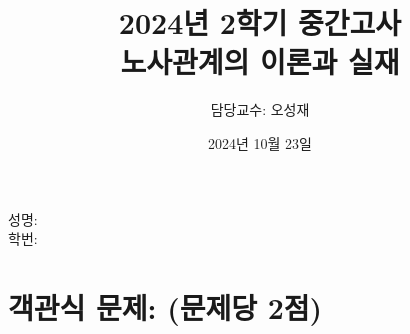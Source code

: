\documentclass[11pt,answers]{exam} %
\begin{document}

    \title{\relax
        2024년 2학기 중간고사 \\
        \Large
        노사관계의 이론과 실재
    }
    \author{담당교수: 오성재}
    \date{2024년 10월 23일}
    \maketitle

    \noindent
    성명: \makebox[.3\textwidth]{\hrulefill} \\[3pt]
    학번: \makebox[.3\textwidth]{\hrulefill}

    \addpoints\relax

\section*{객관식 문제: (문제당 2점)}
\end{document}
